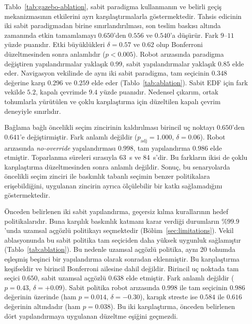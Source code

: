 \documentclass[10pt,letterpaper,onecolumn]{IEEEtran}
\begin{document}


Tablo~\ref{tab:gazebo-ablation}, sabit paradigma kullanmanın ve belirli geçiş
mekanizmasının etkilerini ayrı karşılaştırmalarla göstermektedir. Tahsis
edicinin iki sabit paradigmadan birine sınırlandırılması, son teslim baskısı
altında zamanında etkin tamamlamayı $0.650$'den $0.556$ ve $0.540$'a düşürür.
Fark $9$--$11$ yüzde puanıdır. Etki büyüklükleri $\delta=0.57$ ve $0.62$ olup
Bonferroni düzeltmesinden sonra anlamlıdır ($p<0.005$). Robot arızasında
paradigma değiştiren yapılandırmalar yaklaşık $0.99$, sabit yapılandırmalar
yaklaşık $0.85$ elde eder. Navigasyon vekilinde de aynı iki sabit paradigma,
tam seçicinin $0.348$ değerine karşı $0.296$ ve $0.259$ elde eder
(Tablo~\ref{tab:ablation}). Sabit EDF için fark vekilde $5.2$, kapalı çevrimde
$9.4$ yüzde puanıdır. Nedensel çıkarım, ortak tohumlarla yürütülen ve çoklu
karşılaştırma için düzeltilen kapalı çevrim deneyiyle sınırlıdır.

Bağlama bağlı öncelikli seçim zincirinin kaldırılması birincil uç noktayı
$0.650$'den
$0.641$'e değiştirmiştir. Fark anlamlı değildir
($p_{\mathrm{adj}}=1.000$, $\delta=0.06$). Robot arızasında
\emph{no-override} yapılandırması $0.998$, tam yapılandırma $0.986$ elde
etmiştir. Toparlanma süreleri sırasıyla 63~s ve 84~s'dir. Bu farkların ikisi de
çoklu karşılaştırma düzeltmesinden sonra anlamlı değildir. Sonuç, bu
senaryolarda öncelikli seçim zinciri ile baskınlık tabanlı seçimin benzer
politikalara erişebildiğini, uygulanan zincirin ayrıca ölçülebilir bir katkı
sağlamadığını göstermektedir.

Önceden belirlenen iki sabit yapılandırma, geçersiz kılma kurallarının hedef
politikalarıdır. Buna karşılık baskınlık katmanı karar verdiği durumların
\%$99.9$'unda uzamsal açgözlü politikayı seçmektedir
(Bölüm~\ref{sec:limitations}). Vekil ablasyonunda bu sabit politika tam
seçiciden daha yüksek uygunluk sağlamıştır (Tablo~\ref{tab:ablation}). Bu
nedenle uzamsal açgözlü politika, aynı 20 tohumda eşleşmiş beşinci bir
yapılandırma olarak sonradan eklenmiştir. Bu karşılaştırma keşifseldir ve
birincil Bonferroni ailesine dahil değildir. Birincil uç noktada tam seçici
$0.650$, sabit uzamsal açgözlü $0.638$ elde etmiştir. Fark anlamlı değildir
($p=0.43$, $\delta=+0.09$). Sabit politika robot arızasında $0.998$ ile tam
seçicinin $0.986$ değerinin üzerinde (ham $p=0.014$, $\delta=-0.30$), karışık
streste ise $0.584$ ile $0.616$ değerinin altındadır (ham $p=0.038$). Bu iki
karşılaştırma, önceden belirlenen dört yapılandırmaya uygulanan düzeltme
eşiğini geçmezdi.
\end{document}
